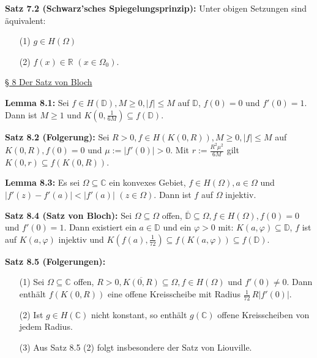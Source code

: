 \documentclass[11pt]{article}
\newcommand{\C}{\mathbb{C}}
\newcommand{\R}{\mathbb{R}}
\newcommand{\D}{\mathbb{D}}
\begin{document}
\newpage
\textbf{Satz 7.2 (Schwarz'sches Spiegelungsprinzip):} Unter obigen Setzungen sind äquivalent:
\vspace{-0.6cm}  
\begin{itemize}
\item[(1)] $g \in H(\Omega)$ \vspace{-0.2cm}
\item[(2)] $f(x) \in \R$ $(x \in \Omega_0)$.
\end{itemize}
\vspace{-0.3cm}  

\underline{§ 8 Der Satz von Bloch}

\textbf{Lemma 8.1:} Sei $f \in H(\D), M \geq 0, |f| \leq M$ auf $\D$, $f(0)=0$ und $f'(0) = 1$. Dann ist $M \geq 1$ und $K(0, \frac{1}{6M})\subseteq f(\D)$.

\textbf{Satz 8.2 (Folgerung):} Sei $R > 0, f \in H(K(0,R)), M \geq 0, |f| \leq M$ auf $K(0,R), f(0) = 0$ und $\mu := |f'(0)| > 0$. Mit $r := \frac{R^2 \mu^2}{6M}$ gilt $K(0,r) \subseteq f(K(0,R))$.

\textbf{Lemma 8.3:} Es sei $\Omega \subseteq \C$ ein konvexes Gebiet, $f \in H(\Omega), a \in \Omega$ und $|f'(z) - f'(a)| < |f'(a)|$ $(z \in \Omega)$. Dann ist $f$ auf $\Omega$ injektiv.

\textbf{Satz 8.4 (Satz von Bloch):} Sei $\Omega \subseteq \Omega$ offen, $\overline{\D} \subseteq \Omega, f \in H(\Omega), f(0) = 0$ und $f'(0) = 1$. Dann existiert ein $a \in \D$ und ein $\varphi > 0$ mit: $K(a, \varphi) \subseteq \D$, $f$ ist auf $K(a, \varphi)$ injektiv und $K(f(a), \frac{1}{72}) \subseteq f(K(a, \varphi)) \subseteq f(\D)$.

\textbf{Satz 8.5 (Folgerungen):} 
\vspace{-0.6cm}  
\begin{itemize}
\item[(1)] Sei $\Omega \subseteq \C$ offen, $R > 0, \overline{K(0,R)} \subseteq \Omega, f \in H(\Omega)$ und $f'(0) \neq 0$. Dann enthält $f(K(0,R))$ eine offene Kreisscheibe mit Radius $\frac{1}{72} \, R|f'(0)|$. \vspace{-0.2cm}
\item[(2)] Ist $g \in H(\C)$ nicht konstant, so enthält $g(\C)$ offene Kreisscheiben von jedem Radius. \vspace{-0.2cm}
\item[(3)] Aus Satz 8.5 (2) folgt insbesondere der Satz von Liouville.
\vspace{-0.3cm}  
\end{itemize}
\end{document}
